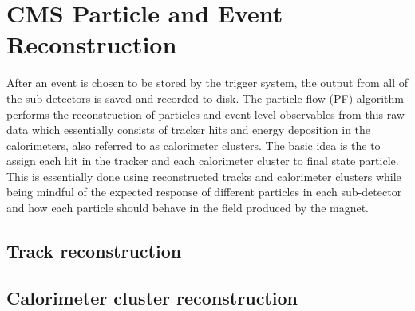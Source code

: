 \chapter{CMS Particle and Event Reconstruction}
After an event is chosen to be stored by the trigger system, the output from all of the sub-detectors is saved and recorded to disk.  The particle flow (PF) algorithm performs the reconstruction of particles and event-level observables from this raw data which essentially consists of tracker hits and energy deposition in the calorimeters, also referred to as calorimeter clusters.  The basic idea is the to assign each hit in the tracker and each calorimeter cluster to final state particle.  This is essentially done using reconstructed tracks and calorimeter clusters while being mindful of the expected response of different particles in each sub-detector and how each particle should behave in the field produced by the magnet.  

\section{Track reconstruction}

\section{Calorimeter cluster reconstruction}


